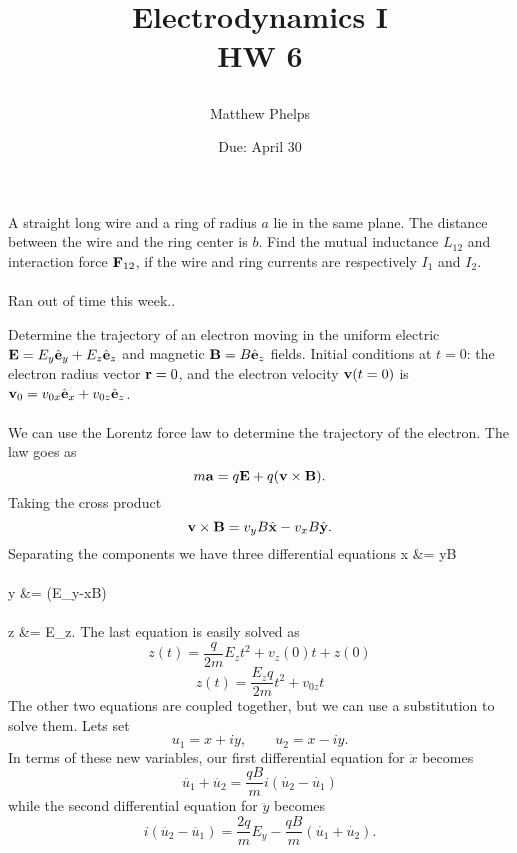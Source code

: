 \documentclass[11pt,letterpaper]{article}
\title{\begin{spacing}{1.2}Electrodynamics I\\HW 6\end{spacing}}
\author{Matthew Phelps}
\date{Due: April 30}
\begin{document}
\maketitle

\benum
  	\item 
	A straight long wire and a ring of radius $a$ lie in the same plane. The distance between the wire and the ring center is $b$. Find
	the mutual inductance $L_{12}$ and interaction force $\mathbf{F}_{12}$, if the wire and ring currents are respectively $I_1$ and $I_2$.
	\\
	\\
	Ran out of time this week..
	\item
	Determine the trajectory of an electron moving in the uniform electric $\mathbf{E} = E_y\hat{\mathbf{e}}_y+E_z\hat{\mathbf{e}}_z$ and 
	magnetic  $\mathbf{B} = B\hat{\mathbf{e}}_z$ fields. Initial conditions at $t=0$: the electron radius vector $\mathbf{r}=0$, and the electron
	velocity $\mathbf{v}(t=0)$ is $\mathbf{v}_0 = v_{0x}\hat{\mathbf{e}}_x+v_{0z}\hat{\mathbf{e}}_z$. 
	\\
	\\
	We can use the Lorentz force law to determine the trajectory of the electron. The law goes as
	\[
		m\mathbf{a}= q\mathbf{E}+q(\mathbf{v}\times \mathbf{B}).
	\]
	Taking the cross product
	\[
		\mathbf{v}\times \mathbf{B} = v_yB\hat{\mathbf{x}} - v_xB\hat{\mathbf{y}}.
	\]
	Separating the components we have three differential equations
	\ba
		\ddot x &= \dot yB \\
		\\
		\ddot y &= (E_y-\dot xB) \\
		\\
		\ddot z &= E_z.
	\ea
	The last equation is easily solved as 
	\[
		z(t) = \frac{q}{2m}E_zt^2+v_{z}(0)t+z(0)
	\]
	\[
		z(t) = \frac{E_zq}{2m}t^2+v_{0z}t
	\]
	The other two equations are coupled together, but we can use a substitution to solve them. Lets set
	\[
		u_1 = x+iy,\qquad u_2 = x-iy.
	\]
	In terms of these new variables, our first differential equation for $\ddot x$ becomes 
	\[
		\ddot{u_1}+\ddot{u_2} = \frac{qB}{m}i(\dot{u_2}-\dot{u_1})
	\]
	while the second differential equation for $\ddot{y}$ becomes
	\[
		i(\ddot{u_2}-\ddot{u_1}) = \frac{2q}{m}E_y - \frac{qB}{m}(\dot{u_1}+\dot{u_2}).
	\]
\end{document}
